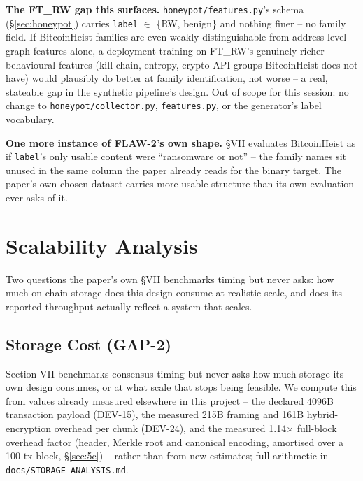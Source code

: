 \documentclass[conference]{IEEEtran}
\begin{document}
\textbf{The FT\_RW gap this surfaces.} \texttt{honeypot/features.py}'s schema
(\S\ref{sec:honeypot}) carries \texttt{label} $\in$ \{RW, benign\} and nothing finer -- no family
field. If BitcoinHeist families are even weakly distinguishable from address-level graph features
alone, a deployment training on FT\_RW's genuinely richer behavioural features (kill-chain,
entropy, crypto-API groups BitcoinHeist does not have) would plausibly do better at family
identification, not worse -- a real, stateable gap in the synthetic pipeline's design. Out of
scope for this session: no change to \texttt{honeypot/collector.py}, \texttt{features.py}, or the
generator's label vocabulary.

\textbf{One more instance of FLAW-2's own shape.} \S VII evaluates BitcoinHeist as if
\texttt{label}'s only usable content were ``ransomware or not'' -- the family names sit unused in
the same column the paper already reads for the binary target. The paper's own chosen dataset
carries more usable structure than its own evaluation ever asks of it.

\section{Scalability Analysis}
\label{sec:scalability}

Two questions the paper's own \S VII benchmarks timing but never asks: how much on-chain storage
does this design consume at realistic scale, and does its reported throughput actually reflect a
system that scales.

\subsection{Storage Cost (GAP-2)}
\label{sec:storage}

Section VII benchmarks consensus timing but never asks how much storage its own design consumes,
or at what scale that stops being feasible. We compute this from values already measured
elsewhere in this project -- the declared 4096B transaction payload (DEV-15), the measured 215B
framing and 161B hybrid-encryption overhead per chunk (DEV-24), and the measured 1.14$\times$
full-block overhead factor (header, Merkle root and canonical encoding, amortised over a 100-tx
block, \S\ref{sec:5c}) -- rather than from new estimates; full arithmetic in
\texttt{docs/STORAGE\_ANALYSIS.md}.
\end{document}
